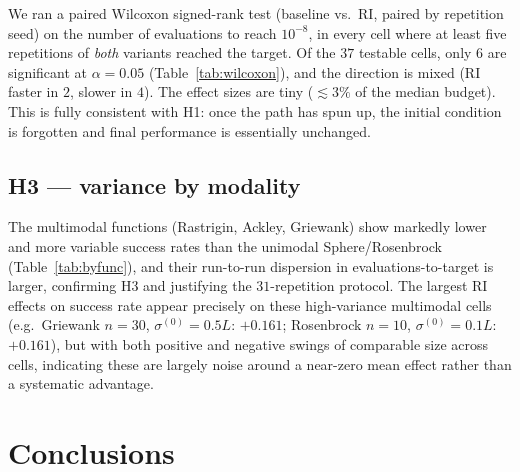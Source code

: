 \documentclass[11pt]{article}
\begin{document}
We ran a paired Wilcoxon signed-rank test (baseline vs.\ RI, paired by repetition seed) on the
number of evaluations to reach $10^{-8}$, in every cell where at least five repetitions of
\emph{both} variants reached the target. Of the $37$ testable cells, only $6$ are significant
at $\alpha=0.05$ (Table~\ref{tab:wilcoxon}), and the direction is mixed (RI faster in $2$,
slower in $4$). The effect sizes are tiny ($\lesssim 3\%$ of the median budget). This is fully
consistent with H1: once the path has spun up, the initial condition is forgotten and final
performance is essentially unchanged.

\begin{table}[H]
\centering
\small

\caption{Cells with a significant paired Wilcoxon difference ($p<0.05$) on evaluations to
$10^{-8}$. Six of $37$ testable cells; mixed direction; small magnitude.}
\label{tab:wilcoxon}
\end{table}

\subsection{H3 --- variance by modality}

The multimodal functions (Rastrigin, Ackley, Griewank) show markedly lower and more variable
success rates than the unimodal Sphere/Rosenbrock (Table~\ref{tab:byfunc}), and their
run-to-run dispersion in evaluations-to-target is larger, confirming H3 and justifying the
$31$-repetition protocol. The largest RI effects on success rate appear precisely on these
high-variance multimodal cells (e.g.\ Griewank $n=30$, $\sigma^{(0)}=0.5L$: $+0.161$;
Rosenbrock $n=10$, $\sigma^{(0)}=0.1L$: $+0.161$), but with both positive and negative
swings of comparable size across cells, indicating these are largely noise around a near-zero
mean effect rather than a systematic advantage.

\section{Conclusions}
\end{document}
